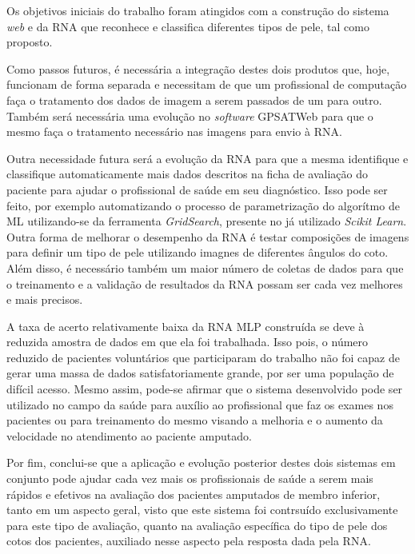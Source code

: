 Os objetivos iniciais do trabalho foram atingidos com a construção do sistema \textit{web} e da RNA que reconhece e classifica diferentes tipos de pele, tal como proposto.

Como passos futuros, é necessária a integração destes dois produtos que, hoje, funcionam de forma separada e necessitam de que um profissional de computação faça o tratamento dos dados de imagem a serem passados de um para outro. Também será necessária uma evolução no \textit{software} GPSATWeb para que o mesmo faça o tratamento necessário nas imagens para envio à RNA.  

Outra necessidade futura será a evolução da RNA para que a mesma identifique e classifique automaticamente mais dados descritos na ficha de avaliação do paciente para ajudar o profissional de saúde em seu diagnóstico. Isso pode ser feito, por exemplo automatizando o processo de parametrização do algorítmo de ML utilizando-se da ferramenta \textit{GridSearch}, presente no já utilizado \textit{Scikit Learn}. Outra forma de melhorar o desempenho da RNA é testar composições de imagens para definir um tipo de pele utilizando imagnes de diferentes ângulos do coto. Além disso, é necessário também um maior número de coletas de dados para que o treinamento e a validação de resultados da RNA possam ser cada vez melhores e mais precisos. 

A taxa de acerto relativamente baixa da RNA MLP construída se deve à reduzida amostra de dados em que ela foi trabalhada. Isso pois, o número reduzido de pacientes voluntários que participaram do trabalho não foi capaz de gerar uma massa de dados satisfatoriamente grande, por ser uma população de difícil acesso. Mesmo assim, pode-se afirmar que o sistema desenvolvido pode ser utilizado no campo da saúde para auxílio ao profissional que faz os exames nos pacientes ou para treinamento do mesmo visando a melhoria e o aumento da velocidade no atendimento ao paciente amputado.

Por fim, conclui-se que a aplicação e evolução posterior destes dois sistemas em conjunto pode ajudar cada vez mais os profissionais de saúde a serem mais rápidos e efetivos na avaliação dos pacientes amputados de membro inferior, tanto em um aspecto geral, visto que este sistema foi contrsuído exclusivamente para este tipo de avaliação, quanto na avaliação específica do tipo de pele dos cotos dos pacientes, auxiliado nesse aspecto pela resposta dada pela RNA.